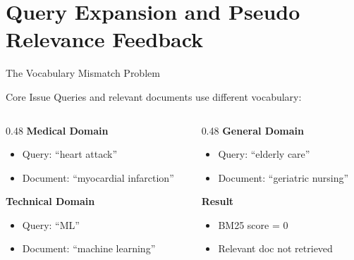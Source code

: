 \documentclass[aspectratio=169]{beamer}
\newif\ifanimated
\newcommand{\cpause}{\ifanimated\pause\fi}
\begin{document}
\section{Query Expansion and Pseudo Relevance Feedback}

\begin{frame}[plain]
\sectionpage
\end{frame}

\begin{frame}[shrink=5]{The Vocabulary Mismatch Problem}
\begin{exampleblock}{Core Issue}
Queries and relevant documents use different vocabulary:
\end{exampleblock}

\vspace{1em}

\begin{columns}
\begin{column}{0.48\textwidth}
\textbf{Medical Domain}
\begin{itemize}
    \item Query: ``heart attack''
    \item Document: ``myocardial infarction''
\end{itemize}\cpause

\vspace{0.5em}

\textbf{Technical Domain}
\begin{itemize}
    \item Query: ``ML''
    \item Document: ``machine learning''
\end{itemize}\cpause
\end{column}

\begin{column}{0.48\textwidth}
\textbf{General Domain}
\begin{itemize}
    \item Query: ``elderly care''
    \item Document: ``geriatric nursing''
\end{itemize}\cpause

\vspace{0.5em}

\textbf{Result}
\begin{itemize}
    \item BM25 score = 0
    \item Relevant doc not retrieved
\end{itemize}\cpause
\end{column}
\end{columns}


\end{frame}
\end{document}
